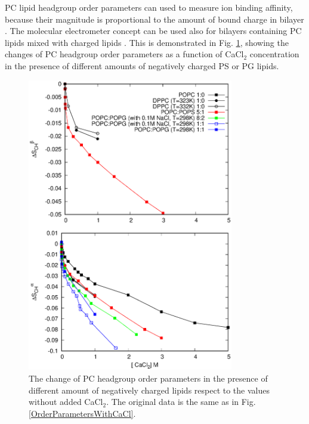 \documentclass[aps,prl,superscriptaddress,twocolumn]{revtex4}
\begin{document}
PC lipid headgroup order parameters can used to measure ion binding
affinity, because their magnitude is proportional
to the amount of bound charge in bilayer \cite{seelig87,catte16}.
The molecular electrometer concept can be used also
for bilayers containing PC lipids mixed with charged lipids \cite{borle85,macdonald87,roux90}.
This is demonstrated in Fig. %
\ref{OrderParameterCHANGESWithCaClBELOW1M},
showing the changes of PC headgroup order parameters %
as a function of CaCl$_2$ concentration in the presence of different amounts of
negatively charged PS or PG lipids.
\begin{figure}[]
  \centering
  \includegraphics[width=9.0cm]{../Figs/CHANGESwithCaCl.eps}
  \caption{\label{OrderParameterCHANGESWithCaClBELOW1M}
    The change of PC headgroup order parameters
    in the presence of different amount of negatively charged lipids
    respect to the values without added CaCl$_2$.
    The original data is the same as in Fig. \ref{OrderParametersWithCaCl}. 
  }
\end{figure}
\end{document}
